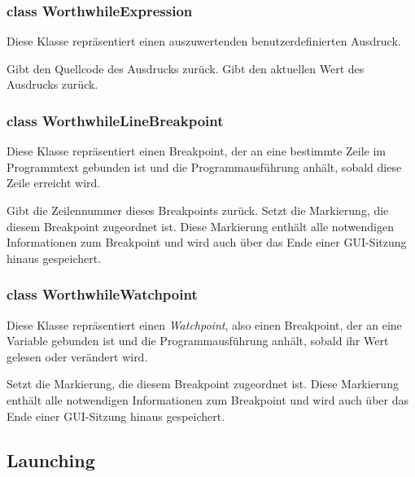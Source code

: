 \subsubsection{class WorthwhileExpression}

Diese Klasse repräsentiert einen auszuwertenden benutzerdefinierten Ausdruck.

\begin{description}
	 Gibt den Quellcode des Ausdrucks zurück.
	 Gibt den aktuellen Wert des Ausdrucks zurück.
\end{description}

\subsubsection{class WorthwhileLineBreakpoint}

Diese Klasse repräsentiert einen Breakpoint, der an eine bestimmte Zeile im Programmtext gebunden ist und die Programmausführung anhält, sobald diese Zeile erreicht wird.

\begin{description}
	 Gibt die Zeilennummer dieses Breakpoints zurück.
	 Setzt die Markierung, die diesem Breakpoint zugeordnet ist. Diese Markierung enthält alle notwendigen Informationen zum Breakpoint und wird auch über das Ende einer GUI-Sitzung hinaus gespeichert.
\end{description}

\subsubsection{class WorthwhileWatchpoint}

Diese Klasse repräsentiert einen \textit{Watchpoint}, also einen Breakpoint, der an eine Variable gebunden ist und die Programmausführung anhält, sobald ihr Wert gelesen oder verändert wird.

\begin{description}
	 Setzt die Markierung, die diesem Breakpoint zugeordnet ist. Diese Markierung enthält alle notwendigen Informationen zum Breakpoint und wird auch über das Ende einer GUI-Sitzung hinaus gespeichert.
\end{description}

\subsection{Launching}

